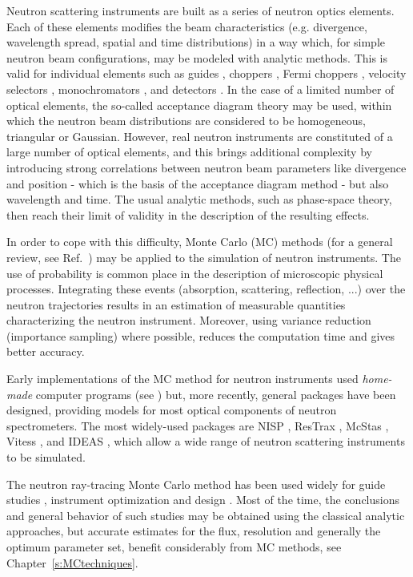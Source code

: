 Neutron scattering instruments are built as a series of neutron optics elements. Each of these elements modifies the beam characteristics (e.g. divergence, wavelength spread, spatial and time distributions) in a way which, for simple neutron beam configurations, may be modeled with analytic methods. This is valid for individual elements such as guides \cite{Leibnitz63,Mildner90}, choppers \cite{Lowde60,Copley03}, Fermi choppers \cite{Fermi47,Peters05}, velocity selectors \cite{Clark66}, monochromators \cite{Freund83,Sears97,Shirane02,Alianelli04}, and detectors \cite{Radeka74,Charpak89,Manzin04}. In the case of a limited number of optical elements, the so-called acceptance diagram theory \cite{Mildner90,Copley93,Cussen03} may be used, within which the neutron beam distributions are considered to be homogeneous, triangular or Gaussian.
However, real neutron instruments are constituted of a large number of optical elements, and this brings additional complexity by introducing strong correlations between neutron beam parameters like divergence and position - which is the basis of the acceptance diagram method - but also wavelength and time. The usual analytic methods, such as phase-space theory, then reach their limit of validity in the description of the resulting effects.

In order to cope with this difficulty, Monte Carlo (MC) methods (for a general review, see Ref.~\cite{James80}) may be applied to the simulation of neutron instruments.
The use of probability is common place in the description of microscopic physical processes. Integrating these events (absorption, scattering, reflection, ...) over the neutron trajectories
results in an estimation of measurable quantities characterizing the neutron instrument. Moreover, using variance reduction (importance sampling)
where possible, reduces the computation time and gives better accuracy.

Early implementations of the MC method for neutron instruments used \emph{home-made} computer programs  (see \cite{Copley86,Mildner77}) but, more recently, general packages have been designed, providing models for most optical components of neutron spectrometers.
The most widely-used packages are NISP \cite{NISP}, ResTrax \cite{Restrax}, McStas \cite{mcs_ppf,nn_10_20,mcstas_webpage}, Vitess \cite{Vitess}, and IDEAS \cite{IDEAS}, which allow a wide range of neutron scattering instruments to be simulated.

The neutron ray-tracing Monte Carlo method has been used widely for
guide studies \cite{Copley93,Farhi02,Schanzer04}, instrument
optimization and design \cite{Zsigmond04,Lieutenant05}. Most of the
time, the conclusions and general behavior of such studies may be
obtained using the classical analytic approaches, but accurate
estimates for the flux, resolution and generally the optimum parameter
set, benefit considerably from MC methods, see Chapter~\ref{s:MCtechniques}.

